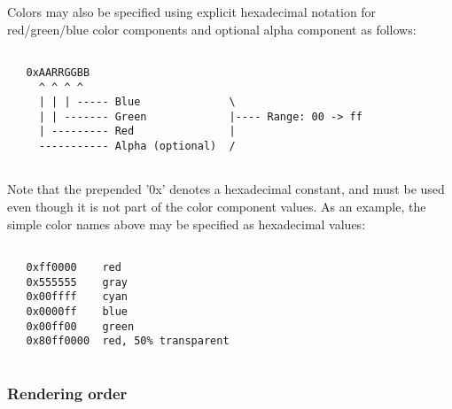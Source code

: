  Colors may also be specified using explicit hexadecimal notation for red/green/blue color components and optional alpha component as follows: \begin{verbatim}

   0xAARRGGBB
     ^ ^ ^ ^          
     | | | ----- Blue              \
     | | ------- Green             |---- Range: 00 -> ff
     | --------- Red               |
     ----------- Alpha (optional)  /
 
\end{verbatim}
 Note that the prepended '0x' denotes a hexadecimal constant, and must be used even though it is not part of the color component values. As an example, the simple color names above may be specified as hexadecimal values: \begin{verbatim}

   0xff0000    red
   0x555555    gray
   0x00ffff    cyan
   0x0000ff    blue
   0x00ff00    green
   0x80ff0000  red, 50% transparent
 
\end{verbatim}

\subsubsection*{Rendering order}


